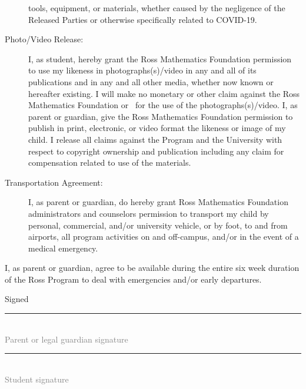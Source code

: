 \documentclass{ross}
\begin{document}
\begin{description}
tools, equipment, or materials, whether caused by the negligence of the Released Parties or otherwise specifically
related to COVID-19.
\item[Photo/Video Release:] I, as student, hereby grant the Ross
  Mathematics Foundation permission to use my likeness in
  photographs(s)/video in any and all of its publications and in any
  and all other media, whether now known or hereafter existing. I will
  make no monetary or other claim against the Ross Mathematics Foundation or
  \campus\ for the use of the photographs(s)/video. I, as parent or
  guardian, give the Ross Mathematics Foundation permission to publish in
  print, electronic, or video format the likeness or image of my
  child. I release all claims against the Program and the University
  with respect to copyright ownership and publication including any
  claim for compensation related to use of the materials.
\item[Transportation Agreement:] I, as parent or guardian, do hereby
  grant Ross Mathematics Foundation administrators and counselors
  permission to transport my child by personal, commercial, and/or
  university vehicle, or by foot, to and from airports, all program
  activities on and off-campus, and/or in the event of a medical
  emergency.
\end{description}
I, as parent or guardian, agree to be available during the entire six
week duration of the Ross Program to deal with emergencies and/or early
departures.

\vspace{0.5in}
\hfill Signed \rule{3in}{0.1mm}\\[-1.5mm]
\hspace*{3.7in} {\footnotesize \textcolor{gray}{Parent or legal guardian signature} }


\vspace{0.5in}

\hfill  \rule{3in}{0.1mm}\\[-1.5mm]
\hspace*{3.7in} {\footnotesize \textcolor{gray}{Student signature} }


\end{document}
